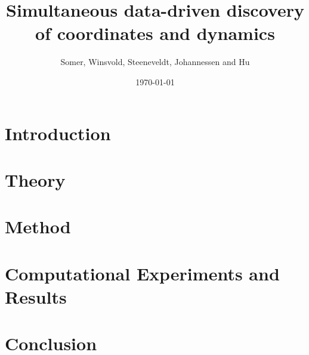 \documentclass[aps,rmp,reprint,amsmath,amssymb,longbibliography,twocolumn,floatfix]{revtex4-1}
\begin{document}
\title{Simultaneous data-driven discovery of coordinates and dynamics}

\author{Somer, Winsvold, Steeneveldt, Johannessen and Hu}
\date{\today}


\begin{abstract}

\end{abstract}

\maketitle

\tableofcontents

\section{Introduction}
\label{sec:introduction}

\section{Theory}
\label{sec:theory}

\section{Method}
\label{sec:method}

\section{Computational Experiments and Results}



\label{sec:results}

\section{Conclusion}
\label{sec:conclusion}

\newpage

\appendix

\end{document}
